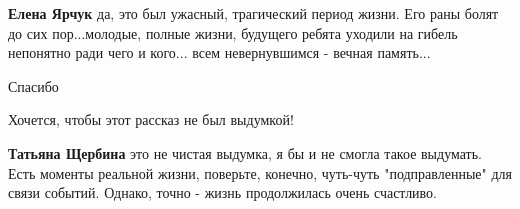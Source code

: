 \begin{itemize}
\begin{itemize} %
\textbf{Елена Ярчук} да, это был ужасный, трагический период жизни. Его раны болят до сих пор...молодые, полные жизни, будущего ребята уходили на гибель непонятно ради чего и кого... всем невернувшимся - вечная память...
\end{itemize} %

Спасибо

Хочется, чтобы этот рассказ не был выдумкой!

\begin{itemize} %
\textbf{Татьяна Щербина} это не чистая выдумка, я бы и не смогла такое выдумать. Есть моменты реальной жизни, поверьте, конечно, чуть-чуть "подправленные" для связи событий. Однако, точно - жизнь продолжилась очень счастливо.
\end{itemize} %

\end{itemize} %
